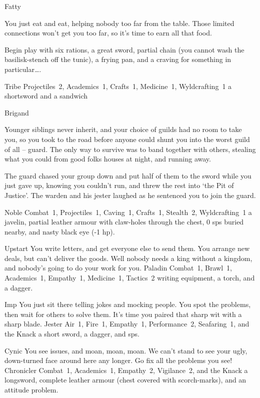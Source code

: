 \begin{multicols}{2}
\begin{itemize}
    {Fatty}%
    {
      You just eat and eat, helping nobody too far from the table.
      Those limited connections won't get you too far, so it's time to earn all that food.

      Begin play with six rations, a great sword, partial chain (you cannot wash the basilisk-stench off the tunic), a frying pan, and a craving for something in particular\ldots.
    }%
    {Tribe}%
    {Projectiles~2, Academics~1, Crafts~1, Medicine~1, Wyldcrafting~1}%
    {a shortsword and a sandwich}%

    {Brigand}%
    {
  Younger siblings never inherit, and your choice of guilds had no room to take you, so you took to the road before anyone could shunt you into the worst guild of all -- \gls{guard}.
  The only way to survive was to band together with others, stealing what you could from good folks houses at night, and running away.

  The \gls{guard} chased your group down and put half of them to the sword while you just gave up, knowing you couldn't run, and threw the rest into `the Pit of Justice'.
  The warden and his jester laughed as he sentenced you to join the \gls{guard}.
  }%
  {Noble}%
  {Combat~1, Projectiles~1, Caving~1, Crafts~1, Stealth~2, Wyldcrafting~1}%
  {a javelin, partial leather armour with claw-holes through the chest, 0 \glspl{sp} buried nearby, and nasty black eye (-1 \gls{hp}).}%


  {Upstart}%
  {You write letters, and get everyone else to send them.
  You arrange new deals, but can't deliver the goods.
  Well nobody needs a king without a kingdom, and nobody's going to do your work for you.
  }%
  {Paladin}%
  {Combat~1, Brawl~1, Academics~1, Empathy~1, Medicine~1, Tactics~2}%
  {writing equipment, a torch, and a dagger.}%

  {Imp}%
  {You just sit there telling jokes and mocking people.
  You spot the problems, then wait for others to solve them.
  It's time you paired that sharp wit with a sharp blade.
  }%
  {Jester}%
  {Air~1, Fire~1, Empathy~1, Performance~2, Seafaring~1, and the Knack \snapcaster}%
  {a short sword, a dagger, and  \glspl{sp}.}%

  {Cynic}%
  {You see issues, and moan, moan, moan.
  We can't stand to see your ugly, down-turned face around here any longer.
  Go fix all the problems you see!
  }%
  {Chronicler}%
  {Combat~1, Academics~1, Empathy~2, Vigilance~2, and the Knack \adrenalinesurge}%
  {a longsword, complete leather armour (chest covered with scorch-marks), and an attitude problem.}%



\end{itemize}
\end{multicols}
